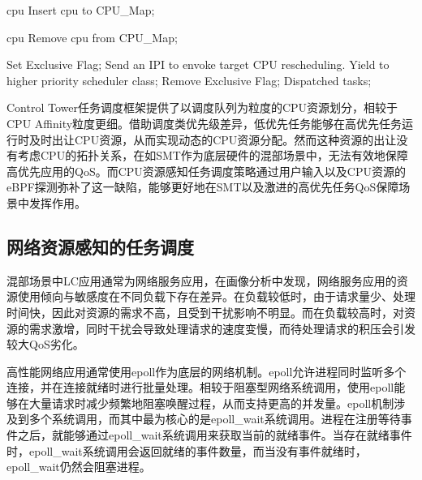 \begin{algorithm}[H]
    \caption{Pseudocode for CPU resource-aware task scheduling}
    \label{alg:cpu_aware_sched}
    \begin{algorithmic}[1]
    
     {cpu}
    \State Insert cpu to CPU\_Map;
    \EndFunction
    
     {cpu}
    \State Remove cpu from CPU\_Map;
    \EndFunction
    
                \State Set Exclusive Flag;
                    \State Send an IPI to envoke target CPU rescheduling.
                \EndFor
                \State Yield to higher priority scheduler class;
            \EndIf
            \State Remove Exclusive Flag;
            \State Dispatched tasks;
        \EndWhile
    \EndFunction
    \end{algorithmic}
\end{algorithm}

Control Tower任务调度框架提供了以调度队列为粒度的CPU资源划分，相较于CPU Affinity粒度更细。借助调度类优先级差异，低优先任务能够在高优先任务运行时及时出让CPU资源，从而实现动态的CPU资源分配。然而这种资源的出让没有考虑CPU的拓扑关系，在如SMT作为底层硬件的混部场景中，无法有效地保障高优先应用的QoS。而CPU资源感知任务调度策略通过用户输入以及CPU资源的eBPF探测弥补了这一缺陷，能够更好地在SMT以及激进的高优先任务QoS保障场景中发挥作用。

\subsection{网络资源感知的任务调度}


混部场景中LC应用通常为网络服务应用，在画像分析中发现，网络服务应用的资源使用倾向与敏感度在不同负载下存在差异。在负载较低时，由于请求量少、处理时间快，因此对资源的需求不高，且受到干扰影响不明显。而在负载较高时，对资源的需求激增，同时干扰会导致处理请求的速度变慢，而待处理请求的积压会引发较大QoS劣化。

高性能网络应用通常使用epoll作为底层的网络机制。epoll允许进程同时监听多个连接，并在连接就绪时进行批量处理。相较于阻塞型网络系统调用，使用epoll能够在大量请求时减少频繁地阻塞唤醒过程，从而支持更高的并发量。epoll机制涉及到多个系统调用，而其中最为核心的是epoll\_wait系统调用。进程在注册等待事件之后，就能够通过epoll\_wait系统调用来获取当前的就绪事件。当存在就绪事件时，epoll\_wait系统调用会返回就绪的事件数量，而当没有事件就绪时，epoll\_wait仍然会阻塞进程。

